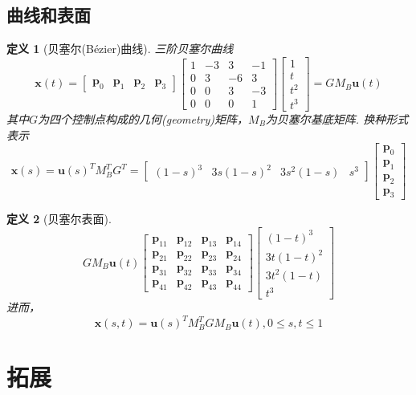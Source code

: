 \documentclass[11pt,UTF8]{ctexart}
\newtheorem{definition}{定义}
\def\vx{\mathbf{x}}
\newcommand{\vb}[1]{\mathbf{#1}}
\begin{document}
\subsection{曲线和表面}
\begin{definition}[贝塞尔(Bézier)曲线]
三阶贝塞尔曲线
\[\vx(t)=\begin{bmatrix}\vb{p}_0&\vb{p}_1&\vb{p}_2&\vb{p}_3\end{bmatrix}\begin{bmatrix}1&-3&3&-1\\0&3&-6&3\\0&0&3&-3\\0&0&0&1\end{bmatrix}\begin{bmatrix}1\\t\\t^2\\t^3\end{bmatrix}=GM_B\vb{u}(t)\]
\rm 其中$G$为四个控制点构成的几何(geometry)矩阵，$M_B$为贝塞尔基底矩阵. 换种形式表示
\[\vx(s)=\vb{u}(s)^TM_B^TG^T=\begin{bmatrix}(1-s)^3&3s(1-s)^2&3s^2(1-s)&s^3\end{bmatrix}\begin{bmatrix}\vb{p}_0\\\vb{p}_1\\\vb{p}_2\\\vb{p}_3\end{bmatrix}\]
\end{definition}
\begin{definition}[贝塞尔表面]
\[GM_B\vb{u}(t)\begin{bmatrix}\vb{p}_{11}&\vb{p}_{12}&\vb{p}_{13}&\vb{p}_{14}\\\vb{p}_{21}&\vb{p}_{22}&\vb{p}_{23}&\vb{p}_{24}\\\vb{p}_{31}&\vb{p}_{32}&\vb{p}_{33}&\vb{p}_{34}\\\vb{p}_{41}&\vb{p}_{42}&\vb{p}_{43}&\vb{p}_{44}\end{bmatrix}\begin{bmatrix}(1-t)^3\\3t(1-t)^2\\3t^2(1-t)\\t^3\end{bmatrix}\]
进而，
\[\vb{x}(s,t)=\vb{u}(s)^TM_B^TGM_B\vb{u}(t),0\leq s,t\leq 1\]
\end{definition}


\section{拓展}
\end{document}
